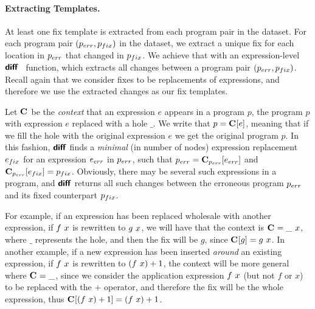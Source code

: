 \paragraph{Extracting Templates.}
At least one fix template is extracted from each program pair in the dataset.
For each program pair $(p_{err}, p_{fix})$ in the dataset, we extract a unique fix
for each location in $p_{err}$ that changed in $p_{fix}$. We achieve that with an
expression-level $\bm{\mathsf{diff}}$~\citep{Lempsink2009-xf} function, which extracts all
changes between a program pair $(p_{err}, p_{fix})$. Recall again that we consider
fixes to be replacements of expressions, and therefore we use the extracted
changes as our fix templates.

Let $\mathbf{C}_{}$ be the \emph{context} that an expression $e$ appears in a
program $p$, \ie the program $p$ with expression $e$ replaced with a hole $\_$.
We write that $p = \mathbf{C}_{}[e]$, meaning that if we fill the hole with the
original expression $e$ we get the original program $p$. In this fashion, $\bm{\mathsf{diff}}$ finds
a \emph{minimal} (in number of nodes) expression replacement $e_{fix}$ for an
expression $e_{err}$ in $p_{err}$, such that $p_{err} = \mathbf{C}_{p_{err}}[e_{err}]$ and
$\mathbf{C}_{p_{err}}[e_{fix}] = p_{fix}$. Obviously, there may be several such
expressions in a program, and $\bm{\mathsf{diff}}$ returns all such changes between the
erroneous program $p_{err}$ and its fixed counterpart $p_{fix}$.

For example, if an expression has been replaced wholesale with another
expression, \eg if $f\ x$ is rewritten to $g\ x$, we will have
that the context is $\mathbf{C}_{} = \_\ x$, where $\_$ represents the
hole, and then the fix will be $g$, since $\mathbf{C}_{}[g] = g\ x$. In
another example, if a new expression has been inserted \emph{around} an existing
expression, \eg if $f\ x$ is rewritten to $(f\ x) + 1$, the
context will be more general where $\mathbf{C}_{} = \_$, since we consider the
application expression $f\ x$ (but not $f$ or $x$) to be replaced with
the $+$ operator, and therefore the fix will be the whole expression, thus
$\mathbf{C}_{}[(f\ x) + 1] = (f\ x) + 1$.


